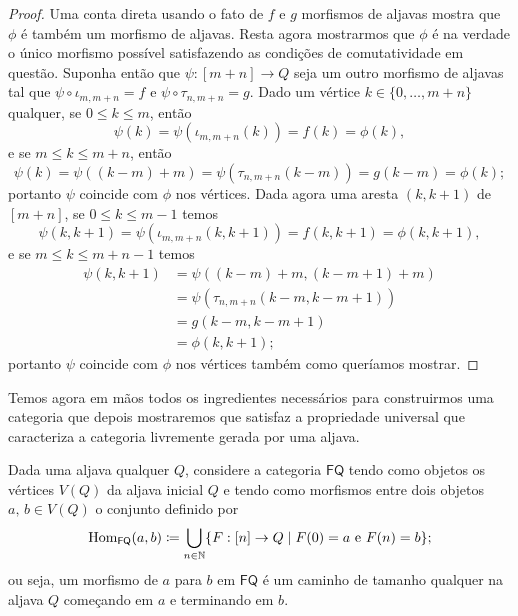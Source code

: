 \begin{proof}
    Uma conta direta usando o fato de $f$ e $g$ morfismos de aljavas mostra que $\phi$ é também um morfismo de aljavas.
    Resta agora mostrarmos que $\phi$ é na verdade o único morfismo possível satisfazendo as condições de comutatividade em questão.
    Suponha então que $\psi: [m+n] \to Q$ seja um outro morfismo de aljavas tal que $\psi \circ \iota_{m,m+n} = f$ e $\psi \circ \tau_{n,m+n} = g$.
    Dado um vértice $k \in \{0,\dots,m+n\}$ qualquer, se $0 \leq k \leq m$, então
    \begin{displaymath}
        \psi(k) = \psi(\iota_{m,m+n}(k)) = f(k) = \phi(k),
    \end{displaymath}
    e se $m \leq k \leq m+n$, então
    \begin{displaymath}
        \psi(k) = \psi((k-m)+m) = \psi(\tau_{n,m+n}(k-m)) = g(k-m) = \phi(k);
    \end{displaymath}
    portanto $\psi$ coincide com $\phi$ nos vértices.
    Dada agora uma aresta $(k,k+1)$ de $[m+n]$, se $0 \leq k \leq m-1$ temos
    \begin{displaymath}
        \psi(k,k+1) = \psi(\iota_{m,m+n}(k,k+1)) = f(k,k+1) = \phi(k,k+1),
    \end{displaymath}
    e se $m \leq k \leq m+n-1$ temos
    \begin{align*}
        \psi(k,k+1)
        & = \psi((k-m)+m,(k-m+1)+m) \\
        & = \psi(\tau_{n,m+n}(k-m,k-m+1)) \\
        & = g(k-m,k-m+1) \\
        & = \phi(k,k+1);
    \end{align*}
    portanto $\psi$ coincide com $\phi$ nos vértices também como queríamos mostrar.
\end{proof}

Temos agora em mãos todos os ingredientes necessários para construirmos uma categoria que depois mostraremos que satisfaz a propriedade universal que caracteriza a categoria livremente gerada por uma aljava.

Dada uma aljava qualquer $Q$, considere a categoria $\mathsf{FQ}$ tendo como objetos os vértices $V(Q)$ da aljava inicial $Q$ e tendo como morfismos entre dois objetos $a,\, b \in V(Q)$ o conjunto definido por
\begin{equation}\label{eq:morfismo_categoria_livre_defin}
    \mathrm{Hom}_{\mathsf{FQ}}(a,b) \coloneqq \bigcup_{n \in \mathbb{N}} \{F: [n] \to Q \mid F(0) = a \text{ e } F(n) = b\};
\end{equation}
ou seja, um morfismo de $a$ para $b$ em $\mathsf{FQ}$ é um caminho de tamanho qualquer na aljava $Q$ começando em $a$ e terminando em $b$.

